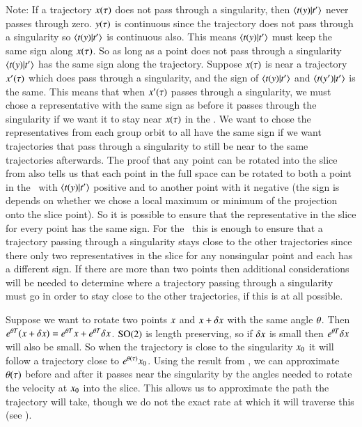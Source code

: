 Note: If a trajectory $x(\tau)$ does not pass through a singularity,
then $\braket{\groupTan(\sspRed)}{\sliceTan{}}$ never passes through
zero. $y(\tau)$ is continuous since the trajectory does not pass
through a singularity so $\braket{\groupTan(\sspRed)}{\sliceTan{}}$ is
continuous also. This means $\braket{\groupTan(\sspRed)}{\sliceTan{}}$
must keep the same sign along $x(\tau)$. So as long as a point does
not pass through a singularity $\braket{\groupTan(\sspRed)}{\sliceTan{}}$
has the same sign along the trajectory. Suppose $x(\tau)$ is near a
trajectory $x'(\tau)$ which does pass through a singularity, and the
sign of $\braket{\groupTan(\sspRed)}{\sliceTan{}}$ and
$\braket{\groupTan(\sspRed')}{\sliceTan{}}$ is the same. This means that
when $x'(\tau)$ passes through a singularity, we must chose a
representative with the same sign as before it passes through the
singularity if we want it to stay near $x(\tau)$ in the \reducedsp. We
want to chose the representatives from each group orbit to all have the
same sign if we want trajectories that pass through a singularity to
still be near to the same trajectories afterwards. The proof that any
point can be rotated into the slice from 
also tells us that each point in the full space can be rotated to both a
point in the \reducedsp\ with $\braket{\groupTan(\sspRed)}{\sliceTan{}}$
positive and to another point with it negative (the sign is depends on
whether we chose a local maximum or minimum of the projection onto the
slice point). So it is possible to ensure that the representative in the
slice for every point has the same sign. For the \cLe\ this is enough to
ensure that a trajectory passing through a singularity stays close to the
other trajectories since there only two representatives in the slice for
any nonsingular point and each has a different sign. If there are more
than two points then additional considerations will be needed to
determine where a trajectory passing through a singularity must go in
order to stay close to the other trajectories, if this is at all
possible.

Suppose we want to rotate two points $x$ and $x+\delta x$ with
the same angle ${\bf \theta}$. Then
$e^{{\bf \theta}T}(x+\delta x)=e^{{\bf \theta}T}x+e^{{\bf \theta}T}\delta x$.
$\textrm{SO}(2)$ is length preserving, so if $\delta x$ is small then
$e^{{\bf \theta}T}\delta x$ will also be small. So when the trajectory is
close to the singularity $x_0$ it will follow a trajectory close to
$e^{{\bf \theta}(\tau)}x_0$. Using the result from
, we can approximate ${\bf \theta}(\tau)$ before and
after it passes near the singularity by the angles needed to rotate the
velocity at $x_0$ into the slice. This allows us to approximate the
path the trajectory will take, though we do not the exact rate at which
it will traverse this (see ).

